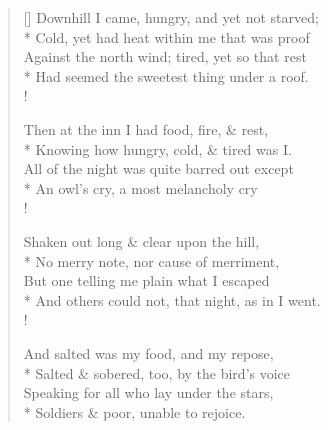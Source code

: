 \documentclass[MAIN]{subfiles}
\begin{document}
\settowidth{\versewidth}{Downhill I came, hungry, and yet not starved;}
\begin{verse}[\versewidth]
Downhill I came, hungry, and yet not starved;\\*
\vin Cold, yet had heat within me that was proof\\
Against the north wind; tired, yet so that rest\\*
\vin Had seemed the sweetest thing under a roof.\\!

Then at the inn I had food, fire, \& rest,\\*
\vin Knowing how hungry, cold, \& tired was I.\\
All of the night was quite barred out except\\*
\vin An owl's cry, a most melancholy cry\\!

Shaken out long \& clear upon the hill,\\*
\vin No merry note, nor cause of merriment,\\
But one telling me plain what I escaped\\*
\vin And others could not, that night, as in I went.\\!

And salted was my food, and my repose,\\*
\vin Salted \& sobered, too, by the bird's voice\\
Speaking for all who lay under the stars,\\*
\vin Soldiers \& poor, unable to rejoice.
\end{verse}
\end{document}

